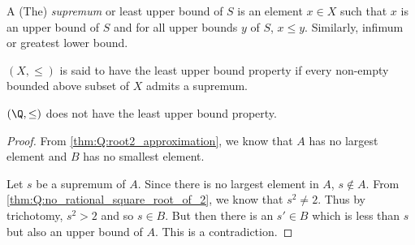 A (The) \emph{supremum} or least upper bound of $S$ is an element $x \in X$
such that $x$ is an upper bound of $S$ and for all upper bounds $y$ of $S$,
$x \le y$.
Similarly, infimum or greatest lower bound.

$(X, \le)$ is said to have the least upper bound property if every non-empty
bounded above subset of $X$ admits a supremum.

\begin{proposition}
    $(\Q, \le)$ does not have the least upper bound property.
\end{proposition}
\begin{proof}
    From \cref{thm:Q:root2_approximation}, we know that $A$ has no largest element
    and $B$ has no smallest element.

    Let $s$ be a supremum of $A$.
    Since there is no largest element in $A$, $s \notin A$.
    From \cref{thm:Q:no_rational_square_root_of_2}, we know that $s^2 \ne 2$.
    Thus by trichotomy, $s^2 > 2$ and so $s \in B$.
    But then there is an $s' \in B$ which is less than $s$ but also an upper
    bound of $A$.
    This is a contradiction.
\end{proof}

